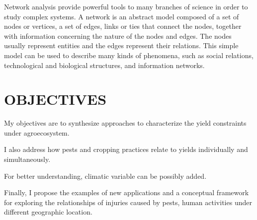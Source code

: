 Network analysis provide powerful tools to many branches of science in order to study complex systems. A network is an abstract model composed of a set of nodes or vertices, a set of edges, links or ties that connect the nodes, together with information concerning the nature of the nodes and edges. The nodes usually represent entities and the edges represent their relations. This simple model can be used to describe many kinds of phenomena, such as social relations, technological and biological structures, and information networks.
\section*{OBJECTIVES}


My objectives are to synthesize approaches to characterize the yield constraints under agroecosystem. 

I also address how pests and cropping practices relate to yields individually and simultaneously. 

For better understanding, climatic variable can be possibly added. 

Finally, I propose the examples of new applications and a conceptual framework for exploring the relationships of injuries caused by pests, human activities under different geographic location.

